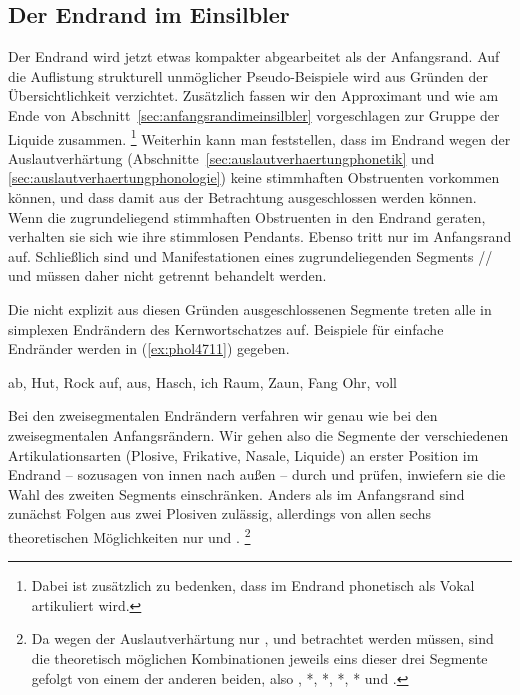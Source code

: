 
\subsection{Der Endrand im Einsilbler}

\label{sec:endrandimeinsilbler}

Der Endrand wird jetzt etwas kompakter abgearbeitet als der Anfangsrand.
Auf die Auflistung strukturell unmöglicher Pseudo-Beispiele wird aus Gründen der Übersichtlichkeit verzichtet.
Zusätzlich fassen wir den Approximant und \textipa{[K]} wie am Ende von Abschnitt~\ref{sec:anfangsrandimeinsilbler} vorgeschlagen zur Gruppe der Liquide zusammen.%
\footnote{Dabei ist zusätzlich zu bedenken, dass \textipa{[K]} im Endrand phonetisch als Vokal artikuliert wird.}
Weiterhin kann man feststellen, dass im Endrand wegen der Auslautverhärtung (Abschnitte~\ref{sec:auslautverhaertungphonetik} und \ref{sec:auslautverhaertungphonologie}) keine stimmhaften Obstruenten vorkommen können, und dass damit \textipa{[b d g v z J]} aus der Betrachtung ausgeschlossen werden können.
Wenn die zugrundeliegend stimmhaften Obstruenten in den Endrand geraten, verhalten sie sich wie ihre stimmlosen Pendants. 
Ebenso tritt \textipa{[h]} nur im Anfangsrand auf.
Schließlich sind \textipa{[\c{c}]} und \textipa{[X]} Manifestationen eines zugrundeliegenden Segments // und müssen daher nicht getrennt behandelt werden.

Die nicht explizit aus diesen Gründen ausgeschlossenen Segmente treten alle in simplexen Endrändern des Kernwortschatzes auf.
Beispiele für einfache Endränder werden in (\ref{ex:phol4711}) gegeben.

\begin{exe}
  \ex\label{ex:phol4711}
  \begin{xlist}
  	\ex ab, Hut, Rock
  	\ex auf, aus, Hasch, ich
  	\ex Raum, Zaun, Fang
  	\ex Ohr, voll
  \end{xlist}
\end{exe}

Bei den zweisegmentalen Endrändern verfahren wir genau wie bei den zweisegmentalen Anfangsrändern.
Wir gehen also die Segmente der verschiedenen Artikulationsarten (Plosive, Frikative, Nasale, Liquide) an erster Position im Endrand -- sozusagen von innen nach außen -- durch und prüfen, inwiefern sie die Wahl des zweiten Segments einschränken.
Anders als im Anfangsrand sind zunächst Folgen aus zwei Plosiven zulässig, allerdings von allen sechs theoretischen Möglichkeiten nur \textipa{[pt]} und \textipa{[kt]}.%
\footnote{Da wegen der Auslautverhärtung nur \textipa{[k]}, \textipa{[t]} und \textipa{[p]} betrachtet werden müssen, sind die theoretisch möglichen Kombinationen jeweils eins dieser drei Segmente gefolgt von einem der anderen beiden, also \textipa{[kt]}, *\textipa{[kp]}, *\textipa{[tk]}, *\textipa{[tp]}, *\textipa{[pk]} und \textipa{[pt]}.}

